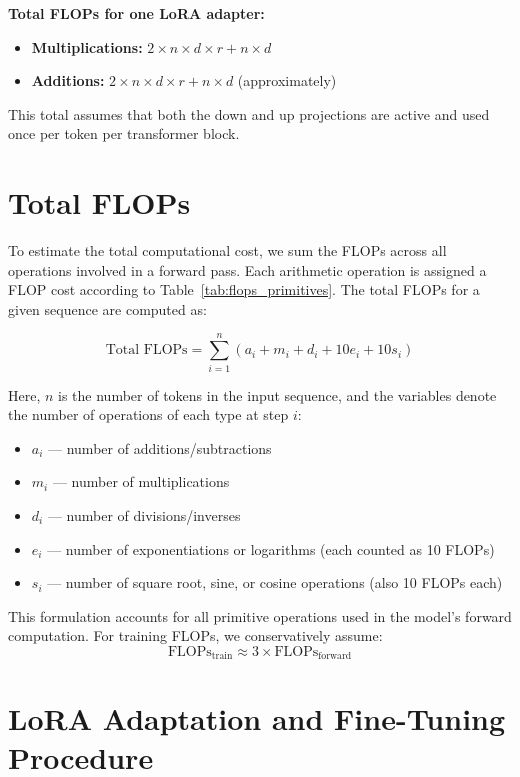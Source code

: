 \documentclass[a4paper,12pt]{article}
\begin{document}
\textbf{Total FLOPs for one LoRA adapter:}
\begin{itemize}
  \item \textbf{Multiplications:} $2 \times n \times d \times r + n \times d$
  \item \textbf{Additions:} $2 \times n \times d \times r + n \times d$ (approximately)
\end{itemize}
This total assumes that both the down and up projections are active and used once per token per transformer block.

\section*{Total FLOPs}

To estimate the total computational cost, we sum the FLOPs across all operations involved in a forward pass. Each arithmetic operation is assigned a FLOP cost according to Table~\ref{tab:flops_primitives}. The total FLOPs for a given sequence are computed as:

\begin{equation}
\text{Total FLOPs} = \sum_{i=1}^{n} \left( a_i + m_i + d_i + 10e_i + 10s_i \right)
\end{equation}

Here, $n$ is the number of tokens in the input sequence, and the variables denote the number of operations of each type at step $i$:
\begin{itemize}
    \item $a_i$ — number of additions/subtractions
    \item $m_i$ — number of multiplications
    \item $d_i$ — number of divisions/inverses
    \item $e_i$ — number of exponentiations or logarithms (each counted as 10 FLOPs)
    \item $s_i$ — number of square root, sine, or cosine operations (also 10 FLOPs each)
\end{itemize}

This formulation accounts for all primitive operations used in the model’s forward computation. For training FLOPs, we conservatively assume:
\[
\text{FLOPs}_{\text{train}} \approx 3 \times \text{FLOPs}_{\text{forward}}
\]

\section{LoRA Adaptation and Fine-Tuning Procedure}
\end{document}
